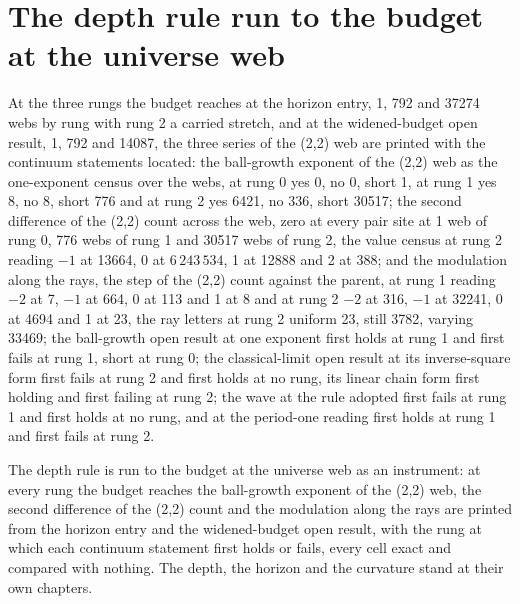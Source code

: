 \section{The depth rule run to the budget at the universe web}\label{mod:X-4-D544065-the-depth-rule-run-to-the-budget-at-the-universe-web}
\begin{chtable}\label{box:X-4-D544065-the-depth-rule-run-to-the-budget-at-the-universe-web:1}
At the three rungs the budget reaches at the horizon entry, 1, 792 and 37274 webs by rung with rung 2 a carried stretch, and at the widened-budget open result, 1, 792 and 14087, the three series of the (2,2) web are printed with the continuum statements located: the ball-growth exponent of the (2,2) web as the one-exponent census over the webs, at rung 0 yes 0, no 0, short 1, at rung 1 yes 8, no 8, short 776 and at rung 2 yes 6421, no 336, short 30517; the second difference of the (2,2) count across the web, zero at every pair site at 1 web of rung 0, 776 webs of rung 1 and 30517 webs of rung 2, the value census at rung 2 reading $-1$ at 13664, 0 at $6\,243\,534$, 1 at 12888 and 2 at 388; and the modulation along the rays, the step of the (2,2) count against the parent, at rung 1 reading $-2$ at 7, $-1$ at 664, 0 at 113 and 1 at 8 and at rung 2 $-2$ at 316, $-1$ at 32241, 0 at 4694 and 1 at 23, the ray letters at rung 2 uniform 23, still 3782, varying 33469; the ball-growth open result at one exponent first holds at rung 1 and first fails at rung 1, short at rung 0; the classical-limit open result at its inverse-square form first fails at rung 2 and first holds at no rung, its linear chain form first holding and first failing at rung 2; the wave at the rule adopted first fails at rung 1 and first holds at no rung, and at the period-one reading first holds at rung 1 and first fails at rung 2.
\end{chtable}
The depth rule is run to the budget at the universe web as an instrument: at every rung the budget reaches the ball-growth exponent of the (2,2) web, the second difference of the (2,2) count and the modulation along the rays are printed from the horizon entry and the widened-budget open result, with the rung at which each continuum statement first holds or fails, every cell exact and compared with nothing. The depth, the horizon and the curvature stand at their own chapters.
